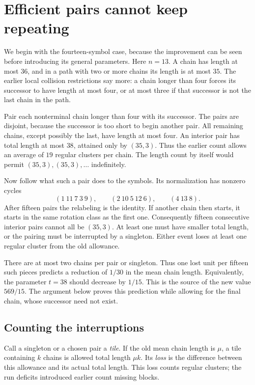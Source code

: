 \section{Efficient pairs cannot keep repeating}\label{sec:pairs}

We begin with the fourteen-symbol case, because the improvement can be
seen before introducing its general parameters. Here $n=13$. A chain
has length at most $36$, and in a path with two or more chains its length
is at most $35$. The earlier local collision restrictions say more: a
chain longer than four forces its successor to have length at most four,
or at most three if that successor is not the last chain in the path.

Pair each nonterminal chain longer than four with its successor. The
pairs are disjoint, because the successor is too short to begin another
pair. All remaining chains, except possibly the last, have length at
most four. An interior pair has total length at most $38$, attained
only by $(35,3)$. Thus the earlier count allows an average of $19$
regular clusters per chain. The length count by itself would permit
$(35,3),(35,3),\ldots$ indefinitely.

Now follow what such a pair does to the symbols. Its normalization has
nonzero cycles
\[
 (1\ 11\ 7\ 3\ 9),\qquad(2\ 10\ 5\ 12\ 6),\qquad(4\ 13\ 8).
\]
After fifteen pairs the relabeling is the identity. If another chain
then starts, it starts in the same rotation class as the first one.
Consequently fifteen consecutive interior pairs cannot all be $(35,3)$.
At least one must have smaller total length, or the pairing must be
interrupted by a singleton. Either event loses at least one regular
cluster from the old allowance.

There are at most two chains per pair or singleton. Thus one lost unit
per fifteen such pieces predicts a reduction of $1/30$ in the mean
chain length. Equivalently, the parameter $t=38$ should decrease by
$1/15$. This is the source of the new value $569/15$. The argument
below proves this prediction while allowing for the final chain, whose
successor need not exist.

\subsection{Counting the interruptions}

Call a singleton or a chosen pair a \emph{tile}. If the old mean chain
length is $\mu$, a tile containing $k$ chains is allowed total length
$\mu k$. Its \emph{loss} is the difference between this allowance and
its actual total length. This loss counts regular clusters; the run
deficits introduced earlier count missing blocks.

